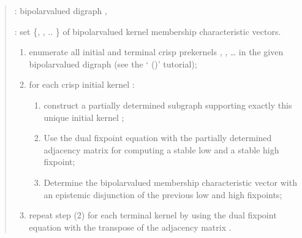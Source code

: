 \documentclass[a4paper,10pt,english]{sphinxhowto}
\begin{document}
\begin{quote}

\begin{DUlineblock}{0em}
\item[]   : bipolar\sphinxhyphen{}valued digraph ,
\item[]  : set \{, , .. \} of bipolar\sphinxhyphen{}valued kernel membership characteristic vectors.
\end{DUlineblock}
\begin{enumerate}
%
\item {} 
enumerate all initial and terminal crisp prekernels , , … in the given bipolar\sphinxhyphen{}valued digraph (see the ‘{\hyperref[\detokenize{tutorial:kernel-tutorial-label}]{}} ()’ tutorial);

\item {} 
for each crisp initial kernel :
\begin{enumerate}
%
\item {} 
construct a partially determined subgraph  supporting exactly this unique initial kernel ;

\item {} 
Use the dual fixpoint equation  with the partially determined adjacency matrix  for computing a stable low and a stable high fixpoint;

\item {} 
Determine the bipolar\sphinxhyphen{}valued \sphinxhyphen{}membership characteristic vector  with an epistemic disjunction of the previous low and high fixpoints;

\end{enumerate}

\item {} 
repeat step (2) for each terminal kernel  by using the dual fixpoint equation with the transpose of the adjacency matrix .

\end{enumerate}
\end{quote}
\end{document}
